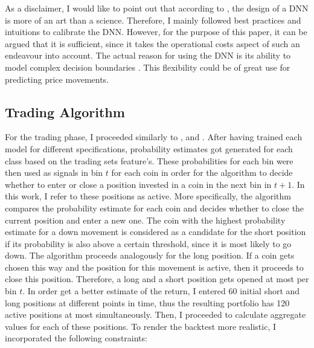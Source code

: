 As a disclaimer, I would like to point out that according to \cite{zhang1998annStateOfTheArt}, the design of a DNN is more of an art than a science.
Therefore, I mainly followed best practices and intuitions to calibrate the DNN. 
However, for the purpose of this paper, it can be argued that it is sufficient, since it takes the operational costs aspect of such an endeavour into account.
The actual reason for using the DNN is its ability to model complex decision boundaries \cite{karimi2019DNNdecisionBoundary}. 
This flexibility could be of great use for predicting price movements.



\subsection{Trading Algorithm} \label{ch:trading_algorithm}
For the trading phase, I proceeded similarly to 
\cite{krauss2019statisticalArbitrage}, \cite{gatev2006pairsTrading} and \cite{krauss2016arbitrageSandP}.
After having trained each model for different specifications, probability estimates got generated for each class
based on the trading sets feature's. These probabilities for each bin were then used as signals in bin $t$ for each coin
in order for the algorithm to decide whether to enter or close a position invested in a coin in the next bin in $ t + 1 $.
In this work, I refer to these positions as active.
More specifically, the algorithm compares the probability estimate for each coin and decides 
whether to close the current position and enter a new one. The coin with the highest probability estimate for a down movement
is considered as a candidate for the short position if its probability is also above a certain threshold,
since it is most likely to go down. 
The algorithm proceeds analogously for the long position. 
If a coin gets chosen this way and the position for this movement is active, then it proceeds to close this position.
Therefore, a long and a short position gets opened at most per bin $ t $.
In order get a better estimate of the return, I entered 60 initial short and long positions at different points in time,
thus the resulting portfolio has 120 active positions at most simultaneously.
Then, I proceeded to calculate aggregate values for each of these positions. To render the backtest more
realistic, I incorporated the following constraints:
